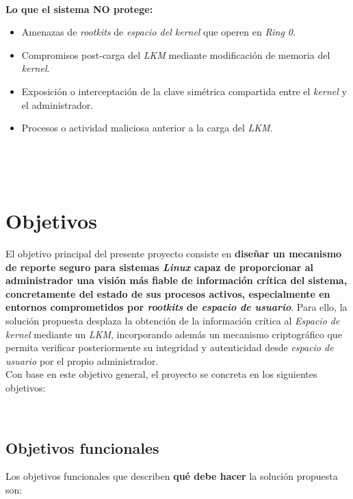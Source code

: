 \

\textbf{Lo que el sistema NO protege:}

\begin{itemize}
    \item Amenazas de \textit{rootkits} de \textit{espacio del kernel} que operen en \textit{Ring 0}.
    \item Compromisos post-carga del \textit{LKM} mediante modificación de memoria del \textit{kernel}.
    \item Exposición o interceptación de la clave simétrica compartida entre el \textit{kernel} y el administrador.
    \item Procesos o actividad maliciosa anterior a la carga del \textit{LKM}.
  \end{itemize}

\

\

\section{Objetivos}

El objetivo principal del presente proyecto consiste en \textbf{diseñar un mecanismo de reporte seguro para sistemas \textit{Linux} capaz de proporcionar al administrador una visión más fiable de información crítica del sistema, concretamente del estado de sus procesos activos, especialmente en entornos comprometidos por \textit{rootkits} de \textit{espacio de usuario}}.
Para ello, la solución propuesta desplaza la obtención de la información crítica al \textit{Espacio de kernel} mediante un \textit{LKM}, incorporando además un mecanismo criptográfico que permita verificar posteriormente su integridad y autenticidad desde \textit{espacio de usuario} por el propio administrador.\\

Con base en este objetivo general, el proyecto se concreta en los siguientes objetivos:

\

\subsection{Objetivos funcionales}
\label{sec:ofunc}

Los objetivos funcionales que describen \textbf{qué debe hacer} la solución propuesta son:

